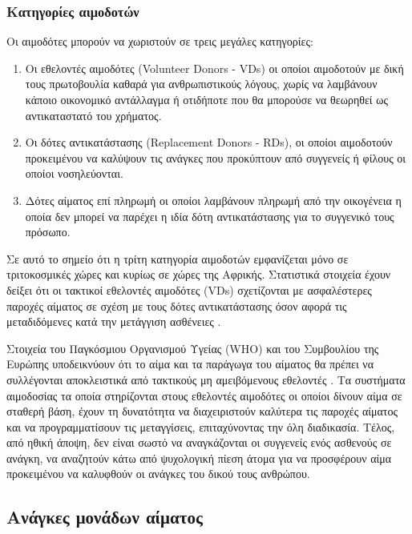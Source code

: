 		\subsubsection{Κατηγορίες αιμοδοτών}
			Οι αιμοδότες μπορούν να χωριστούν σε τρεις μεγάλες κατηγορίες:
\begin{enumerate}
	\item Οι εθελοντές αιμοδότες (Volunteer Donors - VDs) οι οποίοι αιμοδοτούν με δική τους πρωτοβουλία καθαρά για ανθρωπιστικούς λόγους, χωρίς να λαμβάνουν κάποιο οικονομικό αντάλλαγμα ή οτιδήποτε που θα μπορούσε να θεωρηθεί ως αντικαταστατό του χρήματος.
	\item Οι δότες αντικατάστασης (Replacement Donors - RDs), οι οποίοι αιμοδοτούν προκειμένου να καλύψουν τις ανάγκες που προκύπτουν από συγγενείς ή φίλους οι οποίοι νοσηλεύονται.
	\item Δότες αίματος επί πληρωμή οι οποίοι λαμβάνουν πληρωμή από την οικογένεια η οποία δεν μπορεί να παρέχει η ιδία δότη αντικατάστασης για το συγγενικό τους πρόσωπο.
\end{enumerate} 

Σε αυτό το σημείο ότι η τρίτη κατηγορία αιμοδοτών εμφανίζεται μόνο σε τριτοκοσμικές χώρες και κυρίως σε χώρες της Αφρικής. Στατιστικά στοιχεία έχουν δείξει ότι οι τακτικοί εθελοντές αιμοδότες (VDs) σχετίζονται με ασφαλέστερες παροχές αίματος σε σχέση με τους δότες αντικατάστασης όσον αφορά τις μεταδιδόμενες κατά την μετάγγιση ασθένειες \cite{Liu1998}.

Στοιχεία του Παγκόσμιου Οργανισμού Υγείας (WHO) και του Συμβουλίου της Ευρώπης υποδεικνύουν ότι το αίμα και τα παράγωγα του αίματος θα πρέπει να συλλέγονται αποκλειστικά από τακτικούς μη αμειβόμενους εθελοντές \cite{VOX:VOX5295}. Τα συστήματα αιμοδοσίας τα οποία στηρίζονται στους εθελοντές αιμοδότες οι οποίοι δίνουν αίμα σε σταθερή βάση, έχουν τη δυνατότητα να διαχειριστούν καλύτερα τις παροχές αίματος και να προγραμματίσουν τις μεταγγίσεις, επιταχύνοντας την όλη διαδικασία. Τέλος, από ηθική άποψη, δεν είναι σωστό να αναγκάζονται οι συγγενείς ενός ασθενούς σε ανάγκη, να αναζητούν κάτω από ψυχολογική πίεση άτομα για να προσφέρουν αίμα προκειμένου να καλυφθούν οι ανάγκες του δικού τους ανθρώπου.
	\subsection{Ανάγκες μονάδων αίματος}		
